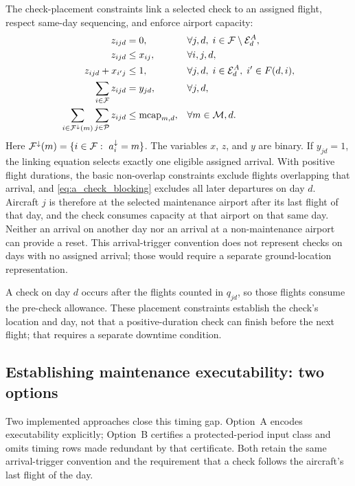 The check-placement constraints link a selected check to an assigned flight,
respect same-day sequencing, and enforce airport capacity:
\begin{align}
  z_{ijd} &= 0,
    && \forall j,d,\;i\in\mathcal{F}\setminus\mathcal{E}^A_d,
       \label{eq:a_check_eligibility}\\
  z_{ijd} &\le x_{ij},
    && \forall i,j,d, \label{eq:a_check_assignment}\\
  z_{ijd}+x_{i'j} &\le 1,
    && \forall j,d,\;i\in\mathcal{E}^A_d,\;i'\in F(d,i),
       \label{eq:a_check_blocking}\\
  \sum_{i\in\mathcal{F}} z_{ijd} &= y_{jd},
    && \forall j,d, \label{eq:a_check_link}\\
  \sum_{i\in\mathcal{F}^{\downarrow}(m)}\sum_{j\in\mathcal{P}}z_{ijd}
    &\le \mathrm{mcap}_{m,d},
    && \forall m\in\mathcal{M},d. \label{eq:a_check_capacity}
\end{align}
Here $\mathcal{F}^{\downarrow}(m)=\{i\in\mathcal{F}:\ a^{\downarrow}_{i}=m\}$. The variables $x$, $z$,
and $y$ are binary. If $y_{jd}=1$, the linking equation selects exactly one
eligible assigned arrival. With positive flight durations, the basic
non-overlap constraints exclude flights overlapping that arrival, and
\eqref{eq:a_check_blocking} excludes all later departures on day $d$.
Aircraft $j$ is therefore at the selected maintenance airport after its
last flight of that day, and the check consumes capacity at that airport
on that same day. Neither an arrival on another day nor an arrival at a
non-maintenance airport can provide a reset. This arrival-trigger convention
does not represent checks on days with no assigned arrival; those would
require a separate ground-location representation.

A check on day $d$ occurs after the flights counted in $q_{jd}$, so those
flights consume the pre-check allowance. These placement constraints establish
the check's location and day, not that a positive-duration check can finish
before the next flight; that requires a separate downtime condition.

\subsection{Establishing maintenance executability: two options}
\label{sec:a_executability}

Two implemented approaches close this timing gap. Option~A encodes
executability explicitly; Option~B certifies a protected-period input class
and omits timing rows made redundant by that certificate. Both retain the same
arrival-trigger convention and the requirement that a check follows the
aircraft's last flight of the day.

